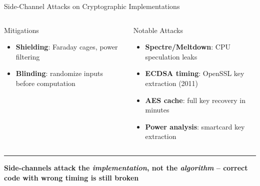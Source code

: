 \documentclass[8pt,aspectratio=169]{beamer}
\newcommand{\bottomnote}[1]{\vfill\vspace{-2mm}\textcolor{mllavender2}{\rule{\textwidth}{0.4pt}}\vspace{1mm}\footnotesize\textbf{#1}}
\begin{document}
\begin{frame}{Side-Channel Attacks on Cryptographic Implementations}
\begin{columns}
\begin{block}{Mitigations}
\begin{itemize}
  \item \textbf{Shielding}: Faraday cages, power filtering
  \item \textbf{Blinding}: randomize inputs before computation
\end{itemize}
\end{block}
\begin{block}{Notable Attacks}
\begin{itemize}\small
  \item \textbf{Spectre/Meltdown}: CPU speculation leaks
  \item \textbf{ECDSA timing}: OpenSSL key extraction (2011)
  \item \textbf{AES cache}: full key recovery in minutes
  \item \textbf{Power analysis}: smartcard key extraction
\end{itemize}
\end{block}
\end{columns}
\bottomnote{Side-channels attack the \emph{implementation}, not the \emph{algorithm} -- correct code with wrong timing is still broken}
\end{frame}
\end{document}
